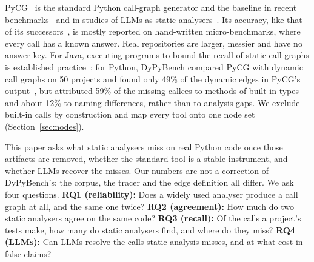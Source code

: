 \documentclass[conference]{IEEEtran}
\begin{document}
PyCG~\cite{salis2021pycg} is the standard Python call-graph generator and the baseline in recent
benchmarks~\cite{bouzenia2024dypybench} and in studies of LLMs as static
analysers~\cite{venkatesh2025llmcg}. Its accuracy, like that of its successors~\cite{huang2023jarvis},
is mostly reported on hand-written micro-benchmarks, where every call has a known answer. Real
repositories are larger, messier and have no answer key. For Java, executing programs to bound
the recall of static call graphs is established practice~\cite{sui2020recall,helm2024totalrecall};
for Python, DyPyBench compared PyCG with dynamic call graphs on 50 projects and found only 49\% of
the dynamic edges in PyCG's output~\cite{bouzenia2024dypybench}, but attributed 59\% of the missing callees to
methods of built-in types and about 12\% to naming differences, rather than to analysis gaps.
We exclude built-in calls by construction and map every tool onto one node set
(Section~\ref{sec:nodes}).

This paper asks what static analysers miss on real Python code once those artifacts are removed,
whether the standard tool is a stable instrument, and whether LLMs recover the misses. Our numbers
are not a correction of DyPyBench's: the corpus, the tracer and the edge definition all differ.
We ask four questions.
\textbf{RQ1 (reliability):} Does a widely used analyser produce a call graph at all, and the same
one twice? \textbf{RQ2 (agreement):} How much do two static analysers agree on the same code?
\textbf{RQ3 (recall):} Of the calls a project's tests make, how many do static analysers find, and
where do they miss? \textbf{RQ4 (LLMs):} Can LLMs resolve the calls static analysis misses, and at
what cost in false claims?
\end{document}
